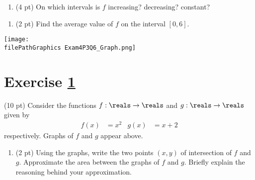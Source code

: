 \spaceSolution{1.75in}{%
}%



\begin{enumerate}[resume,label=(\alph*)]
\item\label{itm : Exam4P3Q5b} (4 pt) On which intervals is $f$ increasing? decreasing? constant?
\end{enumerate}

\spaceSolution{1.75in}{%
}%



\begin{enumerate}[resume,label=(\alph*)]
\item\label{itm : Exam4P3Q5c} (2 pt) Find the average value of $f$ on the interval $[0,6]$.
\end{enumerate}

\spaceSolution{1in}{%
}%





%
%
%
%


\newpage

\begin{center}
\texttt{[image: \\filePathGraphics Exam4P3Q6\_Graph.png]}
\end{center}

\section{Exercise \ref{sec : Math112 Spring2022 FinalExam P3Q6}}
\label{sec : Math112 Spring2022 FinalExam P3Q6}

(10 pt) Consider the functions $f : \reals \rightarrow \reals$ and $g : \reals \rightarrow \reals$ given by
\begin{align*}
f(x)
&=
x^{2}
&
g(x)
&=
x + 2
\end{align*}
respectively. Graphs of $f$ and $g$ appear above.

\begin{enumerate}[label=(\alph*)]
\item\label{itm : Exam4P3Q6a} (2 pt) Using the graphs, write the two points $(x,y)$ of intersection of $f$ and $g$. Approximate the area between the graphs of $f$ and $g$. Briefly explain the reasoning behind your approximation.
\end{enumerate}

\spaceSolution{2in}{%
}%



